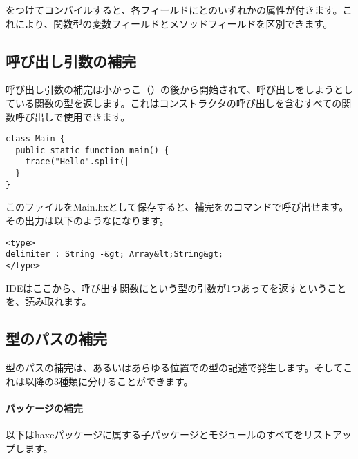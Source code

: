 をつけてコンパイルすると、各フィールドにとのいずれかの属性が付きます。これにより、関数型の変数フィールドとメソッドフィールドを区別できます。

\subsection{呼び出し引数の補完}
\label{cr-completion-call-argument}

呼び出し引数の補完は小かっこ（\ic{(}）の後から開始されて、呼び出しをしようとしている関数の型を返します。これはコンストラクタの呼び出しを含むすべての関数呼び出しで使用できます。

\begin{lstlisting}
class Main {
  public static function main() {
    trace("Hello".split(|
  }
}
\end{lstlisting}

このファイルをMain.hxとして保存すると、補完をのコマンドで呼び出せます。その出力は以下のようなになります。

\begin{lstlisting}
<type>
delimiter : String -&gt; Array&lt;String&gt;
</type>
\end{lstlisting}

IDEはここから、呼び出す関数にという型の引数が1つあってを返すということを、読み取れます。


\subsection{型のパスの補完}
\label{cr-completion-type-path}

型のパスの補完は、あるいはあらゆる位置での型の記述で発生します。そしてこれは以降の3種類に分けることができます。

\paragraph{パッケージの補完}

以下はhaxeパッケージに属する子パッケージとモジュールのすべてをリストアップします。

